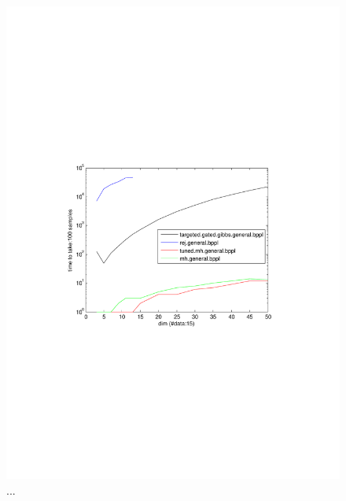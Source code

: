 \begin{figure}%
\centering
\includegraphics[width=1.2\textwidth]{pic1/DimAnalysisDataFixed15.pdf}
\caption{...}
\label{fig:pref}
\end{figure}


